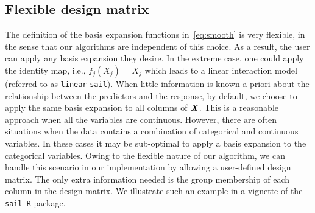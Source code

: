 \documentclass[useAMS,usenatbib,referee]{biom}
\newcommand{\sail}{\texttt{sail}}
\newcommand{\bX}{\textbf{\emph{X}}}
\begin{document}
\subsection{Flexible design matrix} \label{sec:linearsail}

The definition of the basis expansion functions in~\eqref{eq:smooth} is very flexible, in the sense that our algorithms are independent of this choice. 
As a result, the user can apply any basis expansion they desire. 
In the extreme case, one could apply the identity map, i.e., $f_j(X_j) = X_j$ which leads to a linear interaction model (referred to as \texttt{linear} \sail). 
When little information is known a priori about the relationship between the predictors and the response, by default, we choose to apply the same basis expansion to all columns of $\bX$. 
This is a reasonable approach when all the variables are continuous. 
However, there are often situations when the data contains a combination of categorical and continuous variables. 
In these cases it may be sub-optimal to apply a basis expansion to the categorical variables.
Owing to the flexible nature of our algorithm, we can handle this scenario in our implementation by allowing a user-defined design matrix. 
The only extra information needed is the group membership of each column in the design matrix. We illustrate such an example in a vignette of the \sail ~\texttt{R} package.
\end{document}
